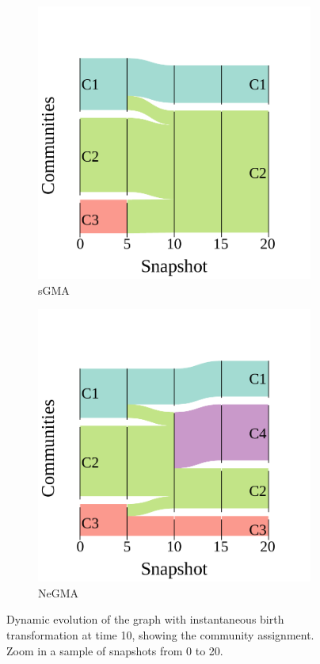 \documentclass[letterpaper]{article}
\begin{document}
\begin{figure}[!t]
    \centering
    \begin{subfigure}[b]{.49\linewidth}
        \centering
        \includegraphics[width=\linewidth]{figures/sankey_birth_sGMA.pdf}
        \caption{sGMA}
        \label{fig:sankey_sGMA}
    \end{subfigure}
    \begin{subfigure}[b]{.49\linewidth}
        \centering
        \includegraphics[width=\linewidth]{figures/sankey_birth_NeGMA.pdf}
        \caption{NeGMA}
        \label{fig:sankey_neGMA}
    \end{subfigure}
    \caption{Dynamic evolution of the graph with instantaneous birth transformation at time 10, showing the community assignment. Zoom in a sample of snapshots from 0 to 20. }
    \label{fig:sankey}
\end{figure}
\end{document}
